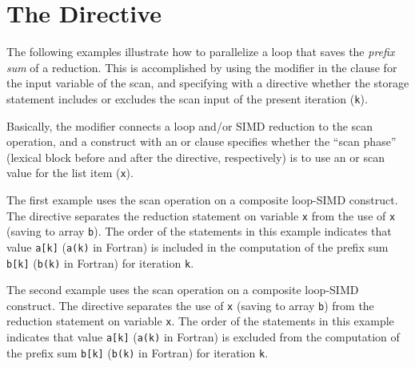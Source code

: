 \pagebreak
\section{The  Directive}
\label{sec:scan}

The following examples illustrate how to parallelize a loop that saves 
the \emph{prefix sum} of a reduction. This is accomplished by using 
the  modifier in the  clause for the input 
variable of the scan, and specifying with a  directive whether 
the storage statement includes or excludes the scan input of the present 
iteration (\texttt{k}).

Basically, the  modifier connects a loop and/or SIMD reduction to 
the scan operation, and a  construct with an  or 
 clause specifies whether the ``scan phase'' (lexical block 
before and after the directive, respectively) is to use an  or 
 scan value for the list item (\texttt{x}).

The first example uses the  scan operation on a composite
loop-SIMD construct. The  directive separates the reduction 
statement on variable \texttt{x} from the use of \texttt{x} (saving to array \texttt{b}).
The order of the statements in this example indicates that
value \texttt{a[k]} (\texttt{a(k)} in Fortran) is included in the computation of 
the prefix sum \texttt{b[k]} (\texttt{b(k)} in Fortran) for iteration \texttt{k}.



The second example uses the  scan operation on a composite
loop-SIMD construct. The  directive separates the use of \texttt{x} 
(saving to array \texttt{b}) from the reduction statement on variable \texttt{x}.
The order of the statements in this example indicates that
value \texttt{a[k]} (\texttt{a(k)} in Fortran) is excluded from the computation 
of the prefix sum \texttt{b[k]} (\texttt{b(k)} in Fortran) for iteration \texttt{k}.



